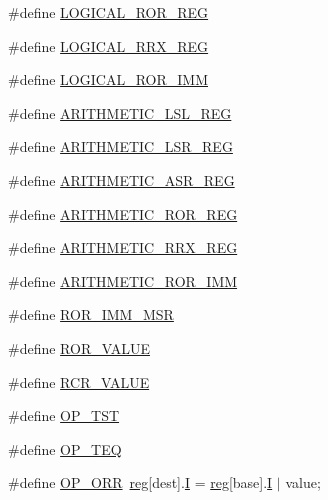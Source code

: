 \begin{DoxyCompactItemize}
\item 
\#define \mbox{\hyperlink{_g_b_a_8cpp_afc0b39e8500e6fd7cbaa25e13026cc0e}{L\+O\+G\+I\+C\+A\+L\+\_\+\+R\+O\+R\+\_\+\+R\+EG}}
\item 
\#define \mbox{\hyperlink{_g_b_a_8cpp_a835764828d538c5d68830f7d9d44bf74}{L\+O\+G\+I\+C\+A\+L\+\_\+\+R\+R\+X\+\_\+\+R\+EG}}
\item 
\#define \mbox{\hyperlink{_g_b_a_8cpp_a0e8f41a2fd38dcb560fb3e0558594281}{L\+O\+G\+I\+C\+A\+L\+\_\+\+R\+O\+R\+\_\+\+I\+MM}}
\item 
\#define \mbox{\hyperlink{_g_b_a_8cpp_a23d5262fc4d82c61d67e8ce48795fcdb}{A\+R\+I\+T\+H\+M\+E\+T\+I\+C\+\_\+\+L\+S\+L\+\_\+\+R\+EG}}
\item 
\#define \mbox{\hyperlink{_g_b_a_8cpp_a8be5e0a331d3bc7956ff3310ffe86b71}{A\+R\+I\+T\+H\+M\+E\+T\+I\+C\+\_\+\+L\+S\+R\+\_\+\+R\+EG}}
\item 
\#define \mbox{\hyperlink{_g_b_a_8cpp_ab5041382af3adc9d16fb9d1018dd7c85}{A\+R\+I\+T\+H\+M\+E\+T\+I\+C\+\_\+\+A\+S\+R\+\_\+\+R\+EG}}
\item 
\#define \mbox{\hyperlink{_g_b_a_8cpp_add20b224236ad60d0152fad9d84f3f9d}{A\+R\+I\+T\+H\+M\+E\+T\+I\+C\+\_\+\+R\+O\+R\+\_\+\+R\+EG}}
\item 
\#define \mbox{\hyperlink{_g_b_a_8cpp_a975d05336b289f7576556fbeba15a5c4}{A\+R\+I\+T\+H\+M\+E\+T\+I\+C\+\_\+\+R\+R\+X\+\_\+\+R\+EG}}
\item 
\#define \mbox{\hyperlink{_g_b_a_8cpp_ab11bb3d4159b15cfca8a3ac5421421f4}{A\+R\+I\+T\+H\+M\+E\+T\+I\+C\+\_\+\+R\+O\+R\+\_\+\+I\+MM}}
\item 
\#define \mbox{\hyperlink{_g_b_a_8cpp_a03315661c577ffd748ff9c2f2ad24b96}{R\+O\+R\+\_\+\+I\+M\+M\+\_\+\+M\+SR}}
\item 
\#define \mbox{\hyperlink{_g_b_a_8cpp_a793652c0fd08b66a203230f71b928fb8}{R\+O\+R\+\_\+\+V\+A\+L\+UE}}
\item 
\#define \mbox{\hyperlink{_g_b_a_8cpp_a3e5cbbfc0d14d2647260250013c74d8a}{R\+C\+R\+\_\+\+V\+A\+L\+UE}}
\item 
\#define \mbox{\hyperlink{_g_b_a_8cpp_af2c62925bd9823c7837b97a0bf587e56}{O\+P\+\_\+\+T\+ST}}
\item 
\#define \mbox{\hyperlink{_g_b_a_8cpp_a1e8149bc8733bf0d4b7a8c817b95a60e}{O\+P\+\_\+\+T\+EQ}}
\item 
\#define \mbox{\hyperlink{_g_b_a_8cpp_adf903b1d05958a7b412adfc804bea1cd}{O\+P\+\_\+\+O\+RR}}~\mbox{\hyperlink{_globals_8h_ae29faba89509024ffd1a292badcedf2d}{reg}}\mbox{[}dest\mbox{]}.\mbox{\hyperlink{thumb_8h_a782b7c7c9a56a2031f6270eac7f000d6}{I}} = \mbox{\hyperlink{_globals_8h_ae29faba89509024ffd1a292badcedf2d}{reg}}\mbox{[}base\mbox{]}.\mbox{\hyperlink{thumb_8h_a782b7c7c9a56a2031f6270eac7f000d6}{I}} $\vert$ value;

\end{DoxyCompactItemize}
